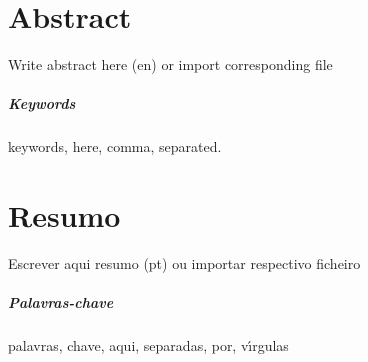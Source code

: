 \documentclass[
  oneside,
  11pt, a4paper,
  footinclude=true,
  headinclude=true,
  cleardoublepage=empty
]{scrbook}
\begin{document}

    




\chapter*{Abstract}
    Write abstract here (en) or import corresponding file

\paragraph{Keywords} keywords, here, comma, separated.

    \cleardoublepage


\chapter*{Resumo}
    Escrever aqui resumo (pt) ou importar respectivo ficheiro
    
\paragraph{Palavras-chave} palavras, chave, aqui, separadas, por, v\'{\i}rgulas
\end{document}
